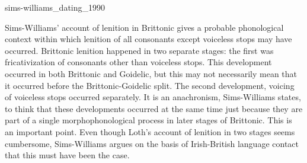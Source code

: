 {%

}{sims-williams_dating_1990}{}

Sims-Williams' account of lenition in Brittonic gives a probable phonological context within which lenition of all consonants except voiceless stops may have occurred. Brittonic lenition happened in two separate stages: the first was fricativization of consonants other than voiceless stops. This development occurred in both Brittonic and Goidelic, but this may not necessarily mean that it occurred before the Brittonic-Goidelic split. The second development, voicing of voiceless stops occurred separately. It is an anachronism, Sims-Williams states, to think that these developments occurred at the same time just because they are part of a single morphophonological process in later stages of Brittonic. This is an important point. Even though Loth's account of lenition in two stages seems cumbersome, Sims-Williams argues on the basis of Irish-British language contact that this must have been the case.

